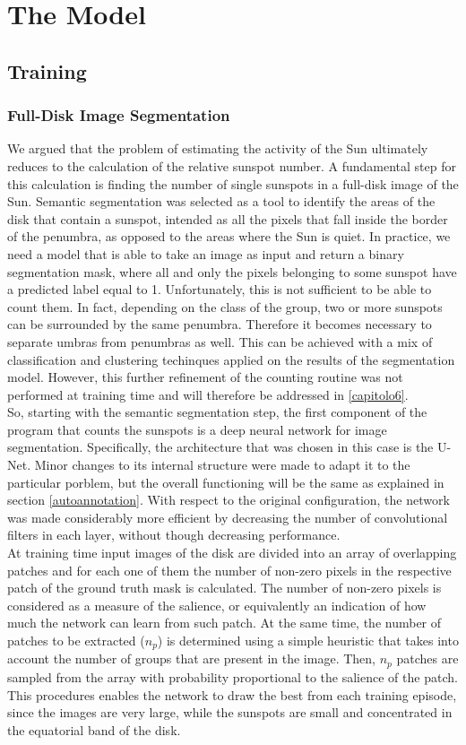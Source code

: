 \chapter{The Model}
\label{capitolo7}
\section{Training}
\subsection{Full-Disk Image Segmentation}
\noindent We argued that the problem of estimating the activity of the Sun ultimately reduces to the calculation of the relative sunspot number. A fundamental step for this calculation is finding the number of single sunspots in a full-disk image of the Sun. Semantic segmentation was selected as a tool to identify the areas of the disk that contain a sunspot, intended as all the pixels that fall inside the border of the penumbra, as opposed to the areas where the Sun is quiet. In practice, we need a model that is able to take an image as input and return a binary segmentation mask, where all and only the pixels belonging to some sunspot have a predicted label equal to 1. Unfortunately, this is not sufficient to be able to count them. In fact, depending on the class of the group, two or more sunspots can be surrounded by the same penumbra. Therefore it becomes necessary to separate umbras from penumbras as well. This can be achieved with a mix of classification and clustering techinques applied on the results of the segmentation model. However, this further refinement of the counting routine was not performed at training time and will therefore be addressed in \autoref{capitolo6}.\\
So, starting with the semantic segmentation step, the first component of the program that counts the sunspots is a deep neural network for image segmentation. Specifically, the architecture that was chosen in this case is the U-Net. Minor changes to its internal structure were made to adapt it to the particular porblem, but the overall functioning will be the same as explained in section \ref{autoannotation}. With respect to the original configuration, the network was made considerably more efficient by decreasing the number of convolutional filters in each layer, without though decreasing performance.\\
At training time input images of the disk are divided into an array of overlapping patches and for each one of them the number of non-zero pixels in the respective patch of the ground truth mask is calculated. The number of non-zero pixels is considered as a measure of the salience, or equivalently an indication of how much the network can learn from such patch. At the same time, the number of patches to be extracted ($n_p$) is determined using a simple heuristic that takes into account the number of groups that are present in the image. Then, $n_p$ patches are sampled from the array with probability proportional to the salience of the patch. This procedures enables the network to draw the best from each training episode, since the images are very large, while the sunspots are small and concentrated in the equatorial band of the disk.\\
